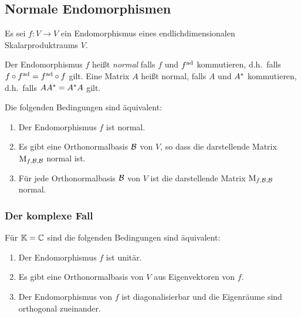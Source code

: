 \subsection{Normale Endomorphismen}

Es sei $f \colon V \to V$ ein Endomorphismus eines endlichdimensionalen Skalarproduktraums $V$.

\begin{definition}
  Der Endomorphismus $f$ heißt \emph{normal} falls $f$ und $f^{\operatorname{ad}}$ kommutieren, d.h.\ falls $f \circ f^{\operatorname{ad}} = f^{\operatorname{ad}} \circ f$ gilt.
  Eine Matrix $A$ heißt normal, falls $A$ und $A^*$ kommutieren, d.h.\ falls $A A^* = A^* A$ gilt.
\end{definition}

\begin{lemma}
  Die folgenden Bedingungen sind äquivalent:
  \begin{enumerate}
    \item
      Der Endomorphismus $f$ ist normal.
    \item
      Es gibt eine Orthonormalbasis $\mathcal{B}$ von $V$, so dass die darstellende Matrix $\operatorname{M}_{f, \mathcal{B}, \mathcal{B}}$ normal ist.
    \item
      Für jede Orthonormalbasis $\mathcal{B}$ von $V$ ist die darstellende Matrix $\operatorname{M}_{f, \mathcal{B}, \mathcal{B}}$ normal.
  \end{enumerate}
\end{lemma}



\subsubsection{Der komplexe Fall}

\begin{theorem}
  Für $\mathbb{K} = \mathbb{C}$ sind die folgenden Bedingungen sind äquivalent:
  \begin{enumerate}
    \item
      Der Endomorphismus $f$ ist unitär.
    \item
      Es gibt eine Orthonormalbasis von $V$ aus Eigenvektoren von $f$.
    \item
      Der Endomorphismus von $f$ ist diagonalisierbar und die Eigenräume sind orthogonal zueinander.
  \end{enumerate}
\end{theorem}

